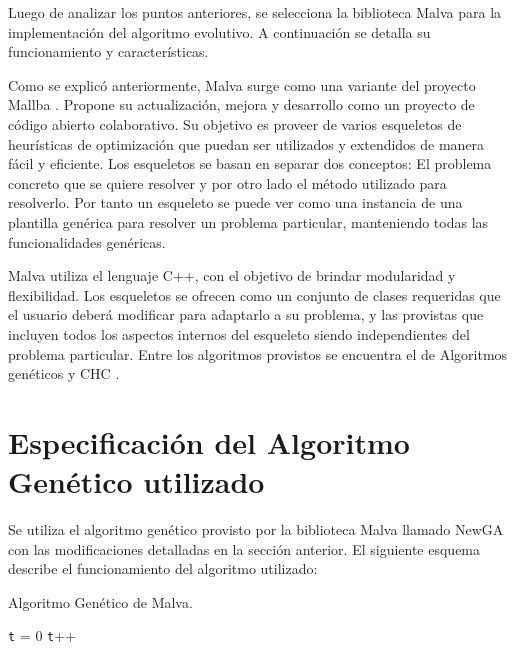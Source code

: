 Luego de analizar los puntos anteriores, se selecciona la biblioteca Malva para la implementación del algoritmo evolutivo. A continuación se detalla su funcionamiento y características.

Como se explicó anteriormente, Malva \citep {Malva} surge como una variante del proyecto Mallba \citep{Mallba}. Propone su actualización, mejora y desarrollo como un proyecto de código abierto colaborativo.  Su objetivo es proveer de varios esqueletos de heurísticas de optimización que puedan ser utilizados y extendidos de manera fácil y eficiente. Los esqueletos se basan en separar dos conceptos: El problema concreto que se quiere resolver y por otro lado el método utilizado para resolverlo. Por tanto un esqueleto se puede ver como una instancia de una plantilla genérica para resolver un problema particular, manteniendo todas las funcionalidades genéricas.

Malva utiliza el lenguaje C++, con el objetivo de brindar modularidad y flexibilidad. Los esqueletos se ofrecen como un conjunto de clases requeridas que el usuario deberá modificar para adaptarlo a su problema, y las provistas que incluyen todos los aspectos internos del esqueleto siendo  independientes del problema particular. Entre los algoritmos provistos se encuentra el de Algoritmos genéticos y CHC \citep{CHC}.


\section{Especificación del Algoritmo Genético utilizado}
Se utiliza el algoritmo genético provisto por la biblioteca  Malva llamado NewGA con las modificaciones detalladas en la sección anterior. El siguiente esquema describe el funcionamiento del algoritmo utilizado:

\begin{algorithm}[H]
	\caption{Algoritmo Genético de Malva. }
	\label{alg:algoritmo_genetico_malva}
	\begin{algorithmic} [1] 
		{
			\STATE \texttt{t} = 0
			\STATE \texttt{t}++		
			\ENDWHILE
		}
	\end{algorithmic}
	
\end{algorithm}


